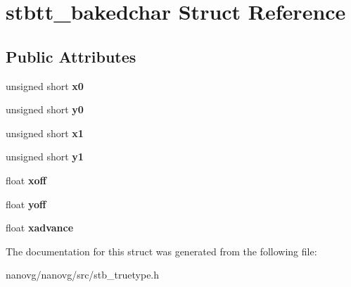 \hypertarget{structstbtt__bakedchar}{\section{stbtt\+\_\+bakedchar Struct Reference}
\label{structstbtt__bakedchar}
}
\subsection*{Public Attributes}
\begin{DoxyCompactItemize}
\item 
\hypertarget{structstbtt__bakedchar_a8011a0ed0410de9fa405c9cb1ab43da2}{unsigned short {\bfseries x0}}\label{structstbtt__bakedchar_a8011a0ed0410de9fa405c9cb1ab43da2}

\item 
\hypertarget{structstbtt__bakedchar_aec4def12c086e0038ba32ff33ee78644}{unsigned short {\bfseries y0}}\label{structstbtt__bakedchar_aec4def12c086e0038ba32ff33ee78644}

\item 
\hypertarget{structstbtt__bakedchar_a72c22c32abde95a5ba02925b8bd892bf}{unsigned short {\bfseries x1}}\label{structstbtt__bakedchar_a72c22c32abde95a5ba02925b8bd892bf}

\item 
\hypertarget{structstbtt__bakedchar_ac831dc667f6c39b5d22740c6cbd5bc3f}{unsigned short {\bfseries y1}}\label{structstbtt__bakedchar_ac831dc667f6c39b5d22740c6cbd5bc3f}

\item 
\hypertarget{structstbtt__bakedchar_a0708a6588a2768b68a3ae59002944b7c}{float {\bfseries xoff}}\label{structstbtt__bakedchar_a0708a6588a2768b68a3ae59002944b7c}

\item 
\hypertarget{structstbtt__bakedchar_aba01393e52d1c6f4ce86a8b51e498bb4}{float {\bfseries yoff}}\label{structstbtt__bakedchar_aba01393e52d1c6f4ce86a8b51e498bb4}

\item 
\hypertarget{structstbtt__bakedchar_ad77b35d1a849d9eb7edb91df05b10536}{float {\bfseries xadvance}}\label{structstbtt__bakedchar_ad77b35d1a849d9eb7edb91df05b10536}

\end{DoxyCompactItemize}


The documentation for this struct was generated from the following file\+:\begin{DoxyCompactItemize}
\item 
nanovg/nanovg/src/stb\+\_\+truetype.\+h\end{DoxyCompactItemize}
